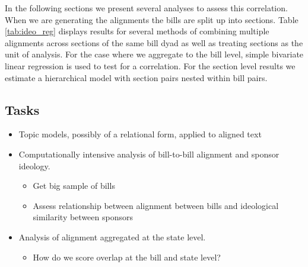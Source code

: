 \documentclass[12pt]{article} %
\begin{document}
In the following sections we present several analyses to assess this correlation. When we are generating the alignments the bills are split up into sections. Table \ref{tab:ideo_reg} displays results for several methods of combining multiple alignments across sections of the same bill dyad as well as treating sections as the unit of analysis. For the case where we aggregate to the bill level, simple bivariate linear regression is used to test for a correlation. 
For the section level results we estimate a hierarchical model with section pairs nested within bill pairs.




\subsection{Tasks}
\begin{itemize}
\item Topic models, possibly of a relational form, applied to aligned text
\item Computationally intensive analysis of bill-to-bill alignment and sponsor ideology.
\begin{itemize}
\item Get big sample of bills
\item Assess relationship between alignment between bills and ideological similarity between sponsors
\end{itemize}
\item Analysis of alignment aggregated at the state level.
\begin{itemize}
\item How do we score overlap at the bill and state level?
\end{itemize}

\end{itemize}




\end{document}
